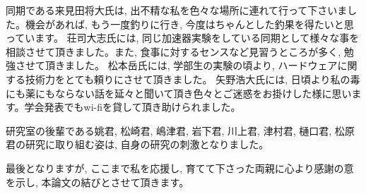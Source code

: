 同期である来見田将大氏は, 出不精な私を色々な場所に連れて行って下さいました。機会があれば, もう一度釣りに行き, 今度はちゃんとした釣果を得たいと思っています。
荘司大志氏には, 同じ加速器実験をしている同期として様々な事を相談させて頂きました。また, 食事に対するセンスなど見習うところが多く, 勉強させて頂きました。
松本岳氏には, 学部生の実験の頃より, ハードウェアに関する技術力をとても頼りにさせて頂きました。
矢野浩大氏には, 日頃より私の毒にも薬にもならない話を延々と聞いて頂き色々とご迷惑をお掛けした様に思います。学会発表でもwi-fiを貸して頂き助けられました。

研究室の後輩である姚君, 松崎君, 嶋津君, 岩下君, 川上君, 津村君, 樋口君, 松原君の研究に取り組む姿は, 自身の研究の刺激となりました。

最後となりますが, ここまで私を応援し, 育てて下さった両親に心より感謝の意を示し, 本論文の結びとさせて頂きます。






